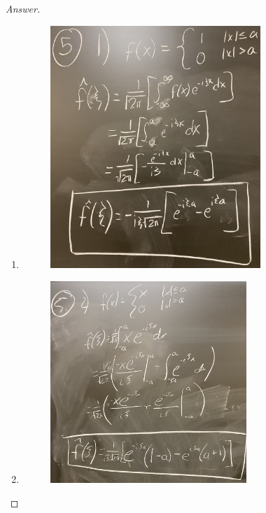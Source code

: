 \documentclass{article}
\theoremstyle{definition}
\renewcommand\qedsymbol{$\blacksquare$}
\newenvironment{ans}{\begin{proof}[Answer]\renewcommand{\qedsymbol}{}}{\end{proof}}
\begin{document}
\begin{ans}
    \begin{enumerate}
        \item \phantom{.}
        \begin{figure}[H]
            \centering
            \includegraphics[width = 0.75\textwidth]{Problem 5 Part 1.jpeg}
        \end{figure}

        \item \phantom{.}
        \begin{figure}[H]
            \centering
            \includegraphics[width = 0.7\textwidth]{Problem 5 Part 2.jpeg}
        \end{figure}


\end{enumerate}
\end{ans}
\end{document}
